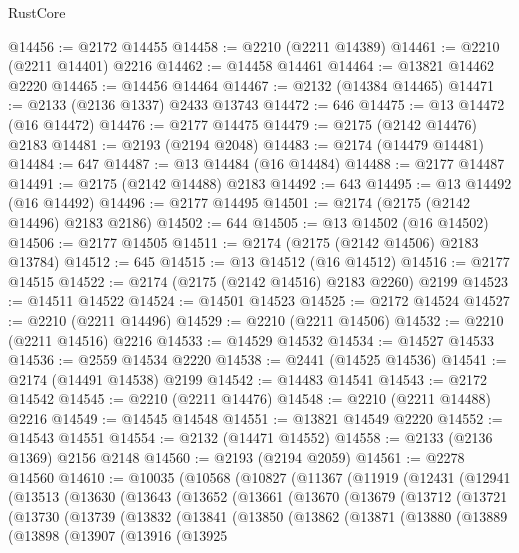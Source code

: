\begin{lexlean}{RustCore}
\begin{coremodule}
@14456 := @2172 @14455
@14458 := @2210 (@2211 @14389)
@14461 := @2210 (@2211 @14401) @2216
@14462 := @14458 @14461
@14464 := @13821 @14462 @2220
@14465 := @14456 @14464
@14467 := @2132 (@14384 @14465)
@14471 := @2133 (@2136 @1337) @2433 @13743
@14472 := 646
@14475 := @13 @14472 (@16 @14472)
@14476 := @2177 @14475
@14479 := @2175 (@2142 @14476) @2183
@14481 := @2193 (@2194 @2048)
@14483 := @2174 (@14479 @14481)
@14484 := 647
@14487 := @13 @14484 (@16 @14484)
@14488 := @2177 @14487
@14491 := @2175 (@2142 @14488) @2183
@14492 := 643
@14495 := @13 @14492 (@16 @14492)
@14496 := @2177 @14495
@14501 := @2174 (@2175 (@2142 @14496) @2183 @2186)
@14502 := 644
@14505 := @13 @14502 (@16 @14502)
@14506 := @2177 @14505
@14511 := @2174 (@2175 (@2142 @14506) @2183 @13784)
@14512 := 645
@14515 := @13 @14512 (@16 @14512)
@14516 := @2177 @14515
@14522 := @2174 (@2175 (@2142 @14516) @2183 @2260) @2199
@14523 := @14511 @14522
@14524 := @14501 @14523
@14525 := @2172 @14524
@14527 := @2210 (@2211 @14496)
@14529 := @2210 (@2211 @14506)
@14532 := @2210 (@2211 @14516) @2216
@14533 := @14529 @14532
@14534 := @14527 @14533
@14536 := @2559 @14534 @2220
@14538 := @2441 (@14525 @14536)
@14541 := @2174 (@14491 @14538) @2199
@14542 := @14483 @14541
@14543 := @2172 @14542
@14545 := @2210 (@2211 @14476)
@14548 := @2210 (@2211 @14488) @2216
@14549 := @14545 @14548
@14551 := @13821 @14549 @2220
@14552 := @14543 @14551
@14554 := @2132 (@14471 @14552)
@14558 := @2133 (@2136 @1369) @2156 @2148
@14560 := @2193 (@2194 @2059)
@14561 := @2278 @14560
@14610 := @10035
    (@10568
      (@10827
        (@11367
          (@11919
            (@12431
              (@12941
                (@13513
                  (@13630
                    (@13643
                      (@13652
                        (@13661
                          (@13670
                            (@13679
                              (@13712
                                (@13721
                                  (@13730
                                    (@13739
                                      (@13832
                                        (@13841
                                          (@13850
                                            (@13862
                                              (@13871
                                                (@13880
                                                  (@13889
                                                    (@13898
                                                      (@13907
                                                        (@13916
                                                          (@13925

\end{coremodule}
\end{lexlean}
